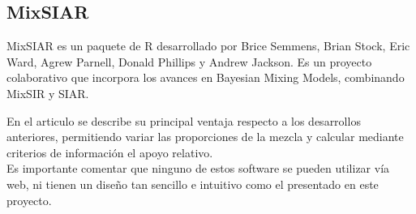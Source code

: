 \subsection{MixSIAR} 
MixSIAR es un paquete de R desarrollado por Brice Semmens, Brian Stock, Eric Ward, Agrew Parnell, Donald Phillips y Andrew Jackson. Es un proyecto colaborativo que incorpora los avances en Bayesian Mixing Models, combinando MixSIR y SIAR.

En el articulo \cite{analyzingMix2018} se describe su principal ventaja respecto a los desarrollos anteriores, permitiendo variar las proporciones de la mezcla y calcular mediante criterios de información el apoyo relativo.\\

Es importante comentar que ninguno de estos software se pueden utilizar vía web, ni tienen un diseño tan sencillo e intuitivo como el presentado en este proyecto.
